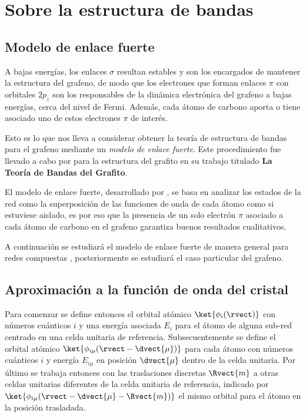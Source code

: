 \section{Sobre la estructura de bandas}
\subsection{Modelo de enlace fuerte}

A bajas energías, los enlaces $ \sigma $ resultan estables y son los encargados de 
mantener la estructura del grafeno, de modo que los electrones que forman enlaces $ 
\pi $ con orbitales $ 2p_z $ son los responsables de la dinámica electrónica del 
grafeno a bajas energías, cerca del nivel de Fermi. Además, cada átomo de carbono 
aporta o tiene asociado uno de estos electrones $ \pi $ de interés.

Esto es lo que nos lleva a considerar obtener la teoría de estructura de bandas para 
el grafeno mediante un \emph{modelo de enlace fuerte}. Este procedimiento fue 
llevado a cabo por \textcite{Wallace1947} para la estructura del grafito en su 
trabajo titulado \textbf{La Teoría de Bandas del Grafito}.

El modelo de enlace fuerte, desarrollado por \textcite{Bloch1929}, se basa en 
analizar los estados de la red como la superposición  de las funciones de onda de 
cada átomo como si estuviese aislado, es por eso que la presencia de un solo 
electrón $ \pi $ asociado a cada átomo de carbono en el grafeno garantiza buenos 
resultados cualitativos.

A continuación se estudiará el modelo de enlace fuerte de manera general para redes 
compuestas \autocite[Según lo desarrollan en ][]{Grosso2000solid}, posteriormente se 
estudiará el caso particular del grafeno.


\subsection{Aproximación a la función de onda del cristal}
Para comenzar se define entonces el orbital atómico $ \ket{\phi_i(\rvect)} $ con 
números cuánticos $ i $ y una energía asociada $ E_i $ para el átomo de alguna 
sub-red centrado en una celda unitaria de referencia.
Subsecuentemente se define el orbital atómico $ \ket{\phi_{i\mu}(\rvect - \dvect{\mu})} $ 
para cada átomo con números cuánticos $ i $ y energía $ E_{i\mu} $ en posición 
$ \dvect{\mu} $ dentro de la celda unitaria.
Por último se trabaja entonces con las traslaciones discretas $ \Rvect{m} $ a otras 
celdas unitarias diferentes de la celda unitaria de referencia, indicado por 
$ \ket{\phi_{i\mu}(\rvect - \dvect{\mu} - \Rvect{m})} $ el mismo orbital para el 
átomo en la posición trasladada.

